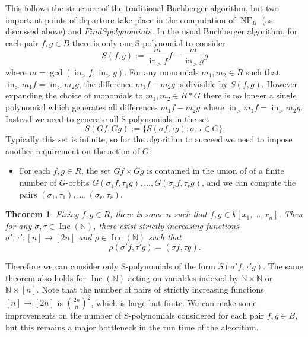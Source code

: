 \documentclass{amsart}
\newtheorem{theorem}{Theorem}[section]
\theoremstyle{definition}
\theoremstyle{remark}
\numberwithin{equation}{section}
\newcommand{\B}[1]{\mathbb #1}
\newcommand{\<}{\langle}
\renewcommand{\>}{\rangle}
\newcommand{\LT}{\operatorname{in}_>}
\newcommand{\Inc}{\operatorname{Inc}(\B N)}
\newcommand{\NF}{\operatorname{NF}}
\begin{document}
This follows the structure of the traditional Buchberger algorithm, but two important points of departure take place in the computation of $\NF_B$ (as discussed above) and $FindSpolynomials$.  In the usual Buchberger algorithm, for each pair $f,g \in B$ there is only one S-polynomial to consider
\[ S(f,g) := \frac{m}{\LT f}f - \frac{m}{\LT g}g \]
where $m = \gcd(\LT f, \LT g)$.  For any monomials $m_1,m_2 \in R$ such that $\LT m_1f = \LT m_2g$, the difference $m_1f - m_2g$ is divisible by $S(f,g)$.  However expanding the choice of monomials to $m_1,m_2 \in R*G$ there is no longer a single polynomial which generates all differences $m_1f - m_2g$ where $\LT m_1f = \LT m_2g$.  Instead we need to generate all S-polynomials in the set
 \[ S(Gf,Gg) := \{ S(\sigma f, \tau g): \sigma,\tau \in G\}. \]
Typically this set is infinite, so for the algorithm to succeed we need to impose another requirement on the action of $G$:
\begin{itemize}
 \item For each $f,g \in R$, the set $Gf \times Gg$ is contained in the union of of a finite number of $G$-orbits $G(\sigma_1 f, \tau_1 g),\ldots,G(\sigma_r f, \tau_r g)$, and we can compute the pairs $(\sigma_1,\tau_1),\ldots,(\sigma_r,\tau_r)$.
\end{itemize}

\begin{theorem}
 Fixing $f,g \in R$, there is some $n$ such that $f,g \in k[x_1,\ldots,x_n]$.  Then for any $\sigma, \tau \in \Inc$, there exist strictly increasing functions $\sigma',\tau': [n] \to [2n]$ and $\rho \in \Inc$ such that
  \[ \rho (\sigma' f, \tau' g) = (\sigma f, \tau g). \]
\end{theorem}

Therefore we can consider only S-polynomials of the form $S(\sigma' f,\tau' g)$.  The same theorem also holds for $\Inc$ acting on variables indexed by $\B N \times \B N$ or $\B N \times [n]$.  Note that the number of pairs of strictly increasing functions $[n] \to [2n]$ is $\binom{2n}{n}^2$, which is large but finite.  We can make some improvements on the number of S-polynomials considered for each pair $f,g \in B$, but this remains a major bottleneck in the run time of the algorithm.
\end{document}
